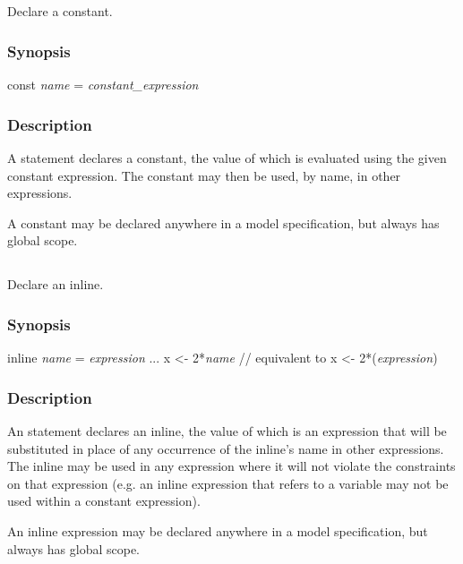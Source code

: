 \subsection{\label{const}}

Declare a constant.

\subsubsection*{Synopsis\label{const_Synopsis}}
\begin{bicode}
const \textsl{name} = \textsl{constant_expression}
\end{bicode}

\subsubsection*{Description\label{const_description}}

A  statement declares a constant, the
value of which is evaluated using the given constant
expression. The constant may then be used, by
name, in other expressions.

A constant may be declared anywhere in a model specification,
but always has global scope.

\subsection{\label{inline}}

Declare an inline.

\subsubsection*{Synopsis\label{inline_synopsis}}
\begin{bicode}
inline \textsl{name} = \textsl{expression}
...
x <- 2*\textsl{name}  // equivalent to x <- 2*(\textsl{expression})
\end{bicode}

\subsubsection*{Description\label{inline_description}}

An  statement declares an inline, the value of which is an expression that will be substituted in
place of any occurrence of the inline's name in other expressions. The inline
may be used in any expression where it will not violate the constraints on
that expression (e.g. an inline expression that refers to a 
variable may not be used within a constant expression).

An inline expression may be declared anywhere in a
model specification, but always has global scope.

